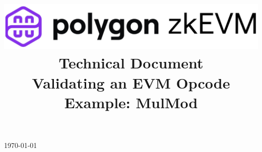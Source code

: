 \documentclass[preprint]{iacrtrans}
\title{
    \includegraphics[width=\columnwidth]{logo_zkEVM.png} 	\\ \vspace{0.3cm}
    Technical Document 										\\ \vspace{0.3cm}	
    Validating an EVM Opcode Example: MulMod     			\\ \vspace{0.3cm}
    \version
}
\institute{}
\begin{document}
\begin{titlepage}
    \centering
    \maketitle
    \today
    \vspace{-5mm}
\end{titlepage}


{\hypersetup{linkcolor=.}\tableofcontents}

\newpage

 
\end{document}
